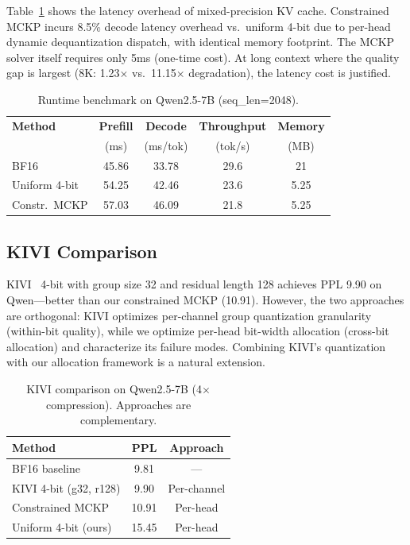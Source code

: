 \documentclass[11pt,a4paper]{article}
\begin{document}
Table~\ref{tab:runtime} shows the latency overhead of mixed-precision KV cache.
Constrained MCKP incurs 8.5\% decode latency overhead vs.\ uniform 4-bit due to per-head dynamic dequantization dispatch, with identical memory footprint.
The MCKP solver itself requires only 5ms (one-time cost).
At long context where the quality gap is largest (8K: 1.23$\times$ vs.\ 11.15$\times$ degradation), the latency cost is justified.

\begin{table}[t]
\centering
\small
\caption{Runtime benchmark on Qwen2.5-7B (seq\_len=2048).}
\label{tab:runtime}
\begin{tabular}{@{}lcccc@{}}
\toprule
\textbf{Method} & \textbf{Prefill} & \textbf{Decode} & \textbf{Throughput} & \textbf{Memory} \\
 & (ms) & (ms/tok) & (tok/s) & (MB) \\
\midrule
BF16 & 45.86 & 33.78 & 29.6 & 21 \\
Uniform 4-bit & 54.25 & 42.46 & 23.6 & 5.25 \\
Constr.\ MCKP & 57.03 & 46.09 & 21.8 & 5.25 \\
\bottomrule
\end{tabular}
\end{table}


\subsection{KIVI Comparison}
\label{sec:kivi}

KIVI~\cite{kivi2024} 4-bit with group size 32 and residual length 128 achieves PPL 9.90 on Qwen---better than our constrained MCKP (10.91).
However, the two approaches are orthogonal: KIVI optimizes per-channel group quantization granularity (within-bit quality), while we optimize per-head bit-width allocation (cross-bit allocation) and characterize its failure modes.
Combining KIVI's quantization with our allocation framework is a natural extension.

\begin{table}[t]
\centering
\small
\caption{KIVI comparison on Qwen2.5-7B (4$\times$ compression). Approaches are complementary.}
\label{tab:kivi}
\begin{tabular}{@{}lcc@{}}
\toprule
\textbf{Method} & \textbf{PPL} & \textbf{Approach} \\
\midrule
BF16 baseline & 9.81 & --- \\
KIVI 4-bit (g32, r128) & 9.90 & Per-channel \\
Constrained MCKP & 10.91 & Per-head \\
Uniform 4-bit (ours) & 15.45 & Per-head \\
\bottomrule
\end{tabular}
\end{table}
\end{document}
